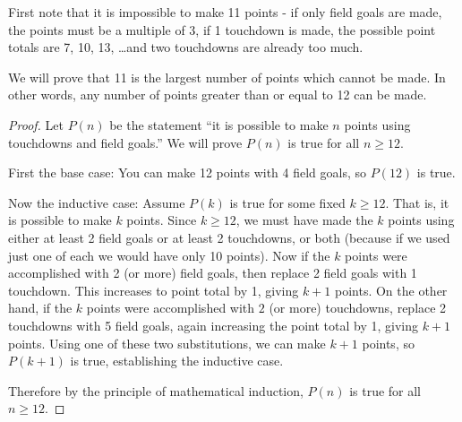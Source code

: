 \documentclass[11pt]{exam}
\begin{document}
\begin{questions}
\begin{solution}
  First note that it is impossible to make 11 points - if only field goals are made, the points must be a multiple of 3, if 1 touchdown is made, the possible point totals are 7, 10, 13, \ldots and two touchdowns are already too much.
  
  We will prove that 11 is the largest number of points which cannot be made.  In other words, any number of points greater than or equal to 12 can be made.
  
  \begin{proof}
    Let $P(n)$ be the statement ``it is possible to make $n$ points using touchdowns and field goals.''  We will prove $P(n)$ is true for all $n \ge 12$.
    
    First the base case: You can make 12 points with 4 field goals, so $P(12)$ is true.
    
    Now the inductive case: Assume $P(k)$ is true for some fixed $k \ge 12$.  That is, it is possible to make $k$ points.  Since $k \ge 12$, we must have made the $k$ points using either at least 2 field goals or at least 2 touchdowns, or both (because if we used just one of each we would have only 10 points).  Now if the $k$ points were accomplished with 2 (or more) field goals, then replace 2 field goals with 1 touchdown.  This increases to point total by 1, giving $k + 1$ points.  On the other hand, if the $k$ points were accomplished with $2$ (or more) touchdowns, replace 2 touchdowns with 5 field goals, again increasing the point total by 1, giving $k+1$ points.  Using one of these two substitutions, we can make $k+1$ points, so $P(k+1)$ is true, establishing the inductive case.
    
    Therefore by the principle of mathematical induction, $P(n)$ is true for all $n \ge 12$.
  \end{proof}
\end{solution}


\end{questions}
\end{document}
